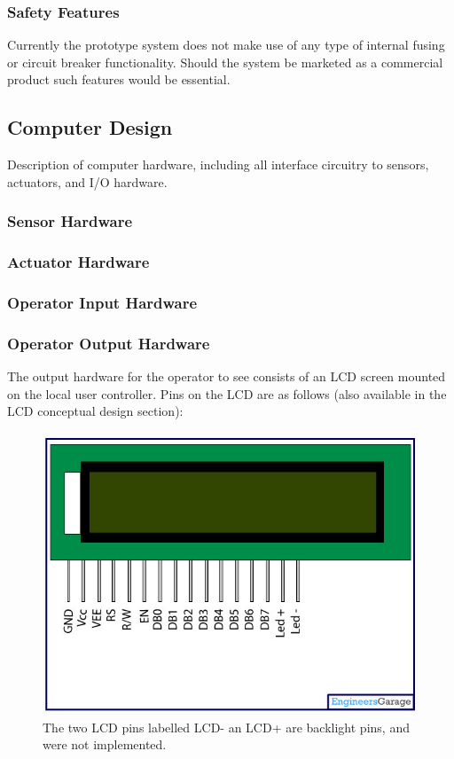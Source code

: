 \documentclass[]{report}
\begin{document}
\subsubsection{Safety Features}
Currently the prototype system does not make use of any type of internal fusing or circuit breaker functionality. Should the system be marketed as a commercial product such features would be essential.

\subsection{Computer Design}
Description of computer hardware, including all interface circuitry to sensors, actuators, and I/O hardware.

\subsubsection{Sensor Hardware}

\subsubsection{Actuator Hardware}

\subsubsection{Operator Input Hardware}

\subsubsection{Operator Output Hardware}
The output hardware for the operator to see consists of an LCD screen mounted on the local user controller. Pins on the LCD are as follows (also available in the LCD conceptual design section):

\begin{figure}
\centering
\includegraphics[width=0.7\linewidth]{"../Diagrams/LcdPins"}
\caption[LCDPinDiagram]{The two LCD pins labelled LCD- an LCD+ are backlight pins, and were not implemented.}
\label{fig:LCDPinDiagram}
\end{figure}
\end{document}
